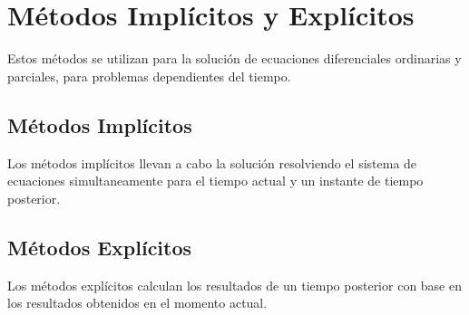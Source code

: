 \documentclass[letterpaper, openright, 12pt]{book}
\begin{document}
    \chapter{Métodos Implícitos y Explícitos}
        Estos métodos se utilizan para la solución
        de ecuaciones diferenciales ordinarias y
        parciales, para problemas dependientes del
        tiempo.
    \section{Métodos Implícitos}
        Los métodos implícitos llevan a cabo la
        solución resolviendo el sistema de
        ecuaciones simultaneamente para el tiempo
        actual y un instante de tiempo posterior.
    \section{Métodos Explícitos}
        Los métodos explícitos calculan los
        resultados de un tiempo posterior con base
        en los resultados obtenidos en el momento
        actual.
\end{document}
